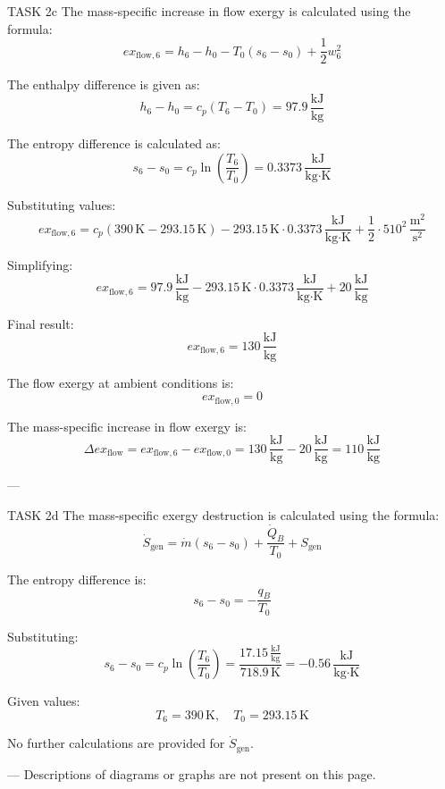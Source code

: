 TASK 2c  
The mass-specific increase in flow exergy is calculated using the formula:  
\[
ex_{\text{flow},6} = h_6 - h_0 - T_0 (s_6 - s_0) + \frac{1}{2} w_6^2
\]  

The enthalpy difference is given as:  
\[
h_6 - h_0 = c_p (T_6 - T_0) = 97.9 \, \frac{\text{kJ}}{\text{kg}}
\]  

The entropy difference is calculated as:  
\[
s_6 - s_0 = c_p \ln \left( \frac{T_6}{T_0} \right) = 0.3373 \, \frac{\text{kJ}}{\text{kg·K}}
\]  

Substituting values:  
\[
ex_{\text{flow},6} = c_p (390 \, \text{K} - 293.15 \, \text{K}) - 293.15 \, \text{K} \cdot 0.3373 \, \frac{\text{kJ}}{\text{kg·K}} + \frac{1}{2} \cdot 510^2 \, \frac{\text{m}^2}{\text{s}^2}
\]  

Simplifying:  
\[
ex_{\text{flow},6} = 97.9 \, \frac{\text{kJ}}{\text{kg}} - 293.15 \, \text{K} \cdot 0.3373 \, \frac{\text{kJ}}{\text{kg·K}} + 20 \, \frac{\text{kJ}}{\text{kg}}
\]  

Final result:  
\[
ex_{\text{flow},6} = 130 \, \frac{\text{kJ}}{\text{kg}}
\]  

The flow exergy at ambient conditions is:  
\[
ex_{\text{flow},0} = 0
\]  

The mass-specific increase in flow exergy is:  
\[
\Delta ex_{\text{flow}} = ex_{\text{flow},6} - ex_{\text{flow},0} = 130 \, \frac{\text{kJ}}{\text{kg}} - 20 \, \frac{\text{kJ}}{\text{kg}} = 110 \, \frac{\text{kJ}}{\text{kg}}
\]  

---

TASK 2d  
The mass-specific exergy destruction is calculated using the formula:  
\[
\dot{S}_{\text{gen}} = \dot{m} \left( s_6 - s_0 \right) + \frac{\dot{Q}_B}{T_0} + S_{\text{gen}}
\]  

The entropy difference is:  
\[
s_6 - s_0 = -\frac{q_B}{T_0}
\]  

Substituting:  
\[
s_6 - s_0 = c_p \ln \left( \frac{T_6}{T_0} \right) = \frac{17.15 \, \frac{\text{kJ}}{\text{kg}}}{718.9 \, \text{K}} = -0.56 \, \frac{\text{kJ}}{\text{kg·K}}
\]  

Given values:  
\[
T_6 = 390 \, \text{K}, \quad T_0 = 293.15 \, \text{K}
\]  

No further calculations are provided for \( \dot{S}_{\text{gen}} \).  

---  
Descriptions of diagrams or graphs are not present on this page.